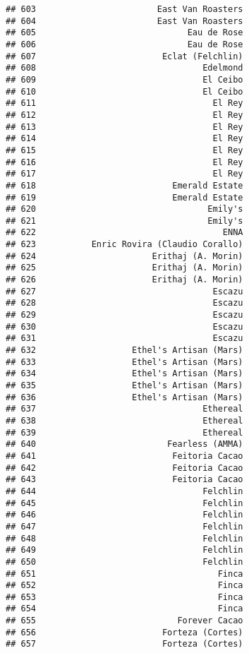 \documentclass[
]{article}
\begin{document}
\begin{verbatim}
## 603                        East Van Roasters
## 604                        East Van Roasters
## 605                              Eau de Rose
## 606                              Eau de Rose
## 607                         Eclat (Felchlin)
## 608                                 Edelmond
## 609                                 El Ceibo
## 610                                 El Ceibo
## 611                                   El Rey
## 612                                   El Rey
## 613                                   El Rey
## 614                                   El Rey
## 615                                   El Rey
## 616                                   El Rey
## 617                                   El Rey
## 618                           Emerald Estate
## 619                           Emerald Estate
## 620                                  Emily's
## 621                                  Emily's
## 622                                     ENNA
## 623           Enric Rovira (Claudio Corallo)
## 624                       Erithaj (A. Morin)
## 625                       Erithaj (A. Morin)
## 626                       Erithaj (A. Morin)
## 627                                   Escazu
## 628                                   Escazu
## 629                                   Escazu
## 630                                   Escazu
## 631                                   Escazu
## 632                   Ethel's Artisan (Mars)
## 633                   Ethel's Artisan (Mars)
## 634                   Ethel's Artisan (Mars)
## 635                   Ethel's Artisan (Mars)
## 636                   Ethel's Artisan (Mars)
## 637                                 Ethereal
## 638                                 Ethereal
## 639                                 Ethereal
## 640                          Fearless (AMMA)
## 641                           Feitoria Cacao
## 642                           Feitoria Cacao
## 643                           Feitoria Cacao
## 644                                 Felchlin
## 645                                 Felchlin
## 646                                 Felchlin
## 647                                 Felchlin
## 648                                 Felchlin
## 649                                 Felchlin
## 650                                 Felchlin
## 651                                    Finca
## 652                                    Finca
## 653                                    Finca
## 654                                    Finca
## 655                            Forever Cacao
## 656                         Forteza (Cortes)
## 657                         Forteza (Cortes)

\end{verbatim}
\end{document}
